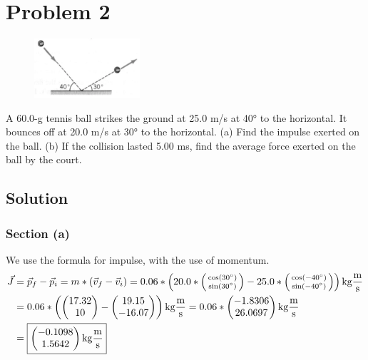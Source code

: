 \documentclass[12pt]{article}
\begin{document}
\pagebreak
\section*{Problem 2}
\begin{figure}
    \vspace{-30pt}
    \includegraphics[width=0.35\textwidth]{graph_2.png} 
\end{figure}
A 60.0-g tennis ball strikes the ground at 25.0 m/s at 40\unit{\degree} to the horizontal. It bounces off at 20.0 m/s at 30\unit{\degree} to the horizontal. (a) Find the impulse exerted on the ball. (b) If the collision lasted 5.00 ms, find the average force exerted on the ball by the court.

\subsection*{Solution}
\subsubsection*{Section (a)}
We use the formula for impulse, with the use of momentum.
\begin{align*}
    \vec{J} &=  \vec{p}_f - \vec{p}_i
        =   m*(\vec{v}_f - \vec{v}_i)
        =   0.06*\left( 20.0*\left(\begin{smallmatrix} \cos(30\unit{\degree}) \\ \sin(30\unit{\degree}) \end{smallmatrix}\right) - 25.0*\left(\begin{smallmatrix} \cos(-40\unit{\degree}) \\ \sin(-40\unit{\degree}) \end{smallmatrix}\right) \right) \unit{\kilo\gram\frac{\meter}{\second}}\\
        &=  0.06*\left( \begin{pmatrix} 17.32 \\ 10 \end{pmatrix} - \begin{pmatrix} 19.15 \\ -16.07 \end{pmatrix} \right) \unit{\kilo\gram\frac{\meter}{\second}}
        =   0.06*\begin{pmatrix} -1.8306 \\ 26.0697 \end{pmatrix} \unit{\kilo\gram\frac{\meter}{\second}}\\
        &=  \boxed{ \begin{pmatrix} -0.1098 \\ 1.5642 \end{pmatrix} \unit{\kilo\gram\frac{\meter}{\second}} }
\end{align*}
\end{document}
